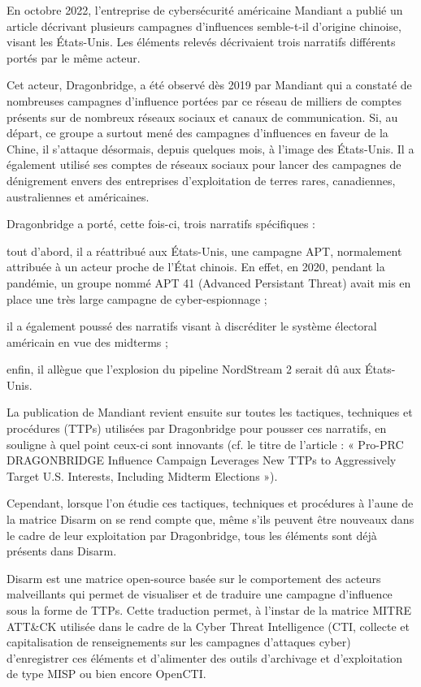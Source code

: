 En octobre 2022, l’entreprise de cybersécurité américaine Mandiant a publié un article décrivant plusieurs campagnes d’influences semble-t-il d’origine chinoise, visant les États-Unis. Les éléments relevés décrivaient trois narratifs différents portés par le même acteur.

Cet acteur, Dragonbridge, a été observé dès 2019 par Mandiant qui a constaté de nombreuses campagnes d’influence portées par ce réseau de milliers de comptes présents sur de nombreux réseaux sociaux et canaux de communication. Si, au départ, ce groupe a surtout mené des campagnes d’influences en faveur de la Chine, il s’attaque désormais, depuis quelques mois, à l’image des États-Unis. Il a également utilisé ses comptes de réseaux sociaux pour lancer des campagnes de dénigrement envers des entreprises d’exploitation de terres rares, canadiennes, australiennes et américaines.

Dragonbridge a porté, cette fois-ci, trois narratifs spécifiques :

    tout d’abord, il a réattribué aux États-Unis, une campagne APT, normalement attribuée à un acteur proche de l’État chinois. En effet, en 2020, pendant la pandémie, un groupe nommé APT 41 (Advanced Persistant Threat) avait mis en place une très large campagne de cyber-espionnage ;

    il a également poussé des narratifs visant à discréditer le système électoral américain en vue des midterms ;

    enfin, il allègue que l’explosion du pipeline NordStream 2 serait dû aux États-Unis.

La publication de Mandiant revient ensuite sur toutes les tactiques, techniques et procédures (TTPs) utilisées par Dragonbridge pour pousser ces narratifs, en souligne à quel point ceux-ci sont innovants (cf. le titre de l’article : « Pro-PRC DRAGONBRIDGE Influence Campaign Leverages New TTPs to Aggressively Target U.S. Interests, Including Midterm Elections »). 

Cependant, lorsque l’on étudie ces tactiques, techniques et procédures à l’aune de la matrice Disarm on se rend compte que, même s’ils peuvent être nouveaux dans le cadre de leur exploitation par Dragonbridge, tous les éléments sont déjà présents dans Disarm.

Disarm est une matrice open-source basée sur le comportement des acteurs malveillants qui permet de visualiser et de traduire une campagne d’influence sous la forme de TTPs. Cette traduction permet, à l’instar de la matrice MITRE ATT&CK utilisée dans le cadre de la Cyber Threat Intelligence (CTI, collecte et capitalisation de renseignements sur les campagnes d’attaques cyber) d’enregistrer ces éléments et d’alimenter des outils d’archivage et d’exploitation de type MISP ou bien encore OpenCTI.

